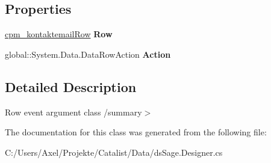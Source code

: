 \subsection*{Properties}
\begin{DoxyCompactItemize}
\item 
\hyperlink{class_products_1_1_data_1_1ds_sage_1_1cpm__kontaktemail_row}{cpm\+\_\+kontaktemail\+Row} {\bfseries Row}\hypertarget{class_products_1_1_data_1_1ds_sage_1_1cpm__kontaktemail_row_change_event_a1ba246831e5600444f0ebb23738a67ef}{}\label{class_products_1_1_data_1_1ds_sage_1_1cpm__kontaktemail_row_change_event_a1ba246831e5600444f0ebb23738a67ef}

\item 
global\+::\+System.\+Data.\+Data\+Row\+Action {\bfseries Action}\hypertarget{class_products_1_1_data_1_1ds_sage_1_1cpm__kontaktemail_row_change_event_a1cdda8d811856670904fefe5f334196e}{}\label{class_products_1_1_data_1_1ds_sage_1_1cpm__kontaktemail_row_change_event_a1cdda8d811856670904fefe5f334196e}

\end{DoxyCompactItemize}


\subsection{Detailed Description}
Row event argument class /summary$>$ 

The documentation for this class was generated from the following file\+:\begin{DoxyCompactItemize}
\item 
C\+:/\+Users/\+Axel/\+Projekte/\+Catalist/\+Data/ds\+Sage.\+Designer.\+cs\end{DoxyCompactItemize}

